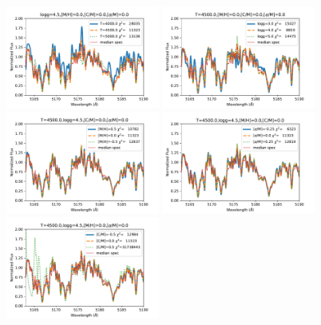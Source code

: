 \documentclass[preprint]{aastex61}
\begin{document}
\begin{figure}[!hbtp]
\begin{centering}
\includegraphics[width=0.45\textwidth]{images/bosz_model_exploration/T_EFF_exploration.pdf}
\includegraphics[width=0.45\textwidth]{images/bosz_model_exploration/LOGG_exploration}
\includegraphics[width=0.45\textwidth]{images/bosz_model_exploration/MH_exploration.pdf}
\includegraphics[width=0.45\textwidth]{images/bosz_model_exploration/ALPHA_exploration.pdf}
\includegraphics[width=0.45\textwidth]{images/bosz_model_exploration/CM_exploration.pdf}

\end{centering}
\end{figure}
\end{document}
